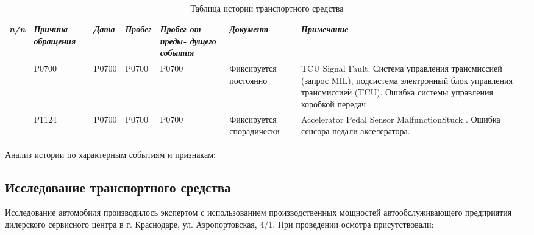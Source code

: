 

{\footnotesize \
	\begin{longtable}[h]{c|m{25mm}|m{15mm}|m{15mm}|m{15mm}|m{30mm}|m{35mm}}
		\caption{Таблица истории транспортного средства}
		\label{table:история}\\ \hline
		\textit{\textbf{n/n}} 
		&\textit{\textbf{Причина обращения}} 
		&\textit{\textbf{Дата}} 
		&\textit{\textbf{Пробег}}
		&\textit{\textbf{Пробег от преды- дущего события}} 
		&\textit{\textbf{Документ}} 
		&\textit{\textbf{Примечание}} \\
		\hline \endhead
		\Rownum & P0700 & P0700 & P0700 & P0700 & Фиксируется постоянно & TCU Signal Fault. Система управления трансмиссией (запрос MIL), подсистема электронный блок управления трансмиссией (TCU). Ошибка системы управления коробкой передач \\
		\hline
		\Rownum & P1124 & P0700 & P0700 & P0700 & Фиксируется спорадически & Accelerator Pedal Sensor MalfunctionStuck . Ошибка сенсора педали акселератора.\\ \hline
\end{longtable}}\setcounter{rownum}{0}
Анализ истории по характерным событиям и признакам:



\subsection{Исследование транспортного средства}
%
Исследование автомобиля производилось экспертом с использованием производственных мощностей автообслуживающего предприятия дилерского сервисного центра в г. Краснодаре, ул. Аэропортовская, 4/1. При проведении осмотра присутствовали: 



